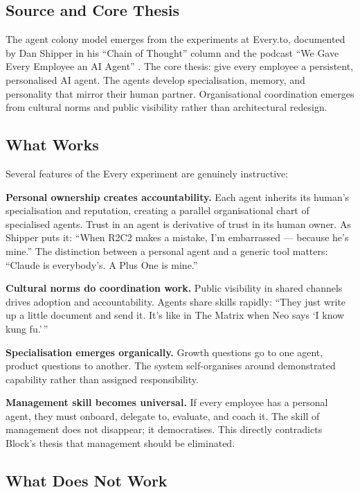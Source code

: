 \subsection{Source and Core Thesis}

The agent colony model emerges from the experiments at Every.to, documented by Dan Shipper in his ``Chain of Thought'' column and the podcast ``We Gave Every Employee an AI Agent'' \parencite{Shipper2026, Klaassen2025}. The core thesis: give every employee a persistent, personalised AI agent. The agents develop specialisation, memory, and personality that mirror their human partner. Organisational coordination emerges from cultural norms and public visibility rather than architectural redesign.

\subsection{What Works}

Several features of the Every experiment are genuinely instructive:

\textbf{Personal ownership creates accountability.} Each agent inherits its human's specialisation and reputation, creating a parallel organisational chart of specialised agents. Trust in an agent is derivative of trust in its human owner. As Shipper puts it: ``When R2C2 makes a mistake, I'm embarrassed --- because he's mine.'' The distinction between a personal agent and a generic tool matters: ``Claude is everybody's. A Plus One is mine.''

\textbf{Cultural norms do coordination work.} Public visibility in shared channels drives adoption and accountability. Agents share skills rapidly: ``They just write up a little document and send it. It's like in The Matrix when Neo says `I know kung fu.'\,''

\textbf{Specialisation emerges organically.} Growth questions go to one agent, product questions to another. The system self-organises around demonstrated capability rather than assigned responsibility.

\textbf{Management skill becomes universal.} If every employee has a personal agent, they must onboard, delegate to, evaluate, and coach it. The skill of management does not disappear; it democratises. This directly contradicts Block's thesis that management should be eliminated.

\subsection{What Does Not Work}

